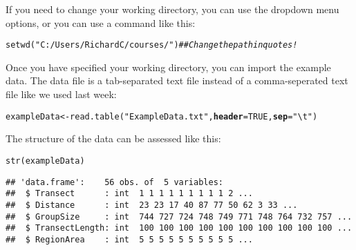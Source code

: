 \documentclass[12pt]{article}\usepackage[]{graphicx}\usepackage[]{color}
\makeatletter
\newcommand{\hlnum}[1]{\textcolor[rgb]{0.69,0.494,0}{#1}}%
\newcommand{\hlstr}[1]{\textcolor[rgb]{0.749,0.012,0.012}{#1}}%
\newcommand{\hlcom}[1]{\textcolor[rgb]{0.514,0.506,0.514}{\textit{#1}}}%
\newcommand{\hlstd}[1]{\textcolor[rgb]{0,0,0}{#1}}%
\newcommand{\hlkwb}[1]{\textcolor[rgb]{0,0.341,0.682}{#1}}%
\newcommand{\hlkwc}[1]{\textcolor[rgb]{0,0,0}{\textbf{#1}}}%
\newcommand{\hlkwd}[1]{\textcolor[rgb]{0.004,0.004,0.506}{#1}}%
\newenvironment{kframe}{%
 \def\at@end@of@kframe{}%
 \ifinner\ifhmode%
  \def\at@end@of@kframe{\end{minipage}}%
  \begin{minipage}{\columnwidth}%
 \fi\fi%
 \def\FrameCommand##1{\hskip\@totalleftmargin \hskip-\fboxsep
 \colorbox{shadecolor}{##1}\hskip-\fboxsep
     \hskip-\linewidth \hskip-\@totalleftmargin \hskip\columnwidth}%
 \MakeFramed {\advance\hsize-\width
   \@totalleftmargin\z@ \linewidth\hsize
   \@setminipage}}%
 {\par\unskip\endMakeFramed%
 \at@end@of@kframe}
\newenvironment{knitrout}{}{} %
\makeatother
\begin{document}
If you need to change your working directory, you can use the dropdown
menu options, or you can use a command like this:

\begin{knitrout}
\color{fgcolor}\begin{kframe}
\begin{alltt}
\hlkwd{setwd}\hlstd{(}\hlstr{"C:/Users/RichardC/courses/"}\hlstd{)} \hlcom{## Change the path in quotes!}
\end{alltt}
\end{kframe}
\end{knitrout}

Once you have specified your working directory, you can import
the example data. The data file is a tab-separated text file
instead of a comma-seperated text file like we used last week:

\begin{knitrout}
\color{fgcolor}\begin{kframe}
\begin{alltt}
\hlstd{exampleData} \hlkwb{<-} \hlkwd{read.table}\hlstd{(}\hlstr{"ExampleData.txt"}\hlstd{,} \hlkwc{header}\hlstd{=}\hlnum{TRUE}\hlstd{,} \hlkwc{sep}\hlstd{=}\hlstr{"\textbackslash{}t"}\hlstd{)}
\end{alltt}
\end{kframe}
\end{knitrout}



The structure of the data can be assessed like this:

\begin{knitrout}
\color{fgcolor}\begin{kframe}
\begin{alltt}
\hlkwd{str}\hlstd{(exampleData)}
\end{alltt}
\begin{verbatim}
## 'data.frame':	56 obs. of  5 variables:
##  $ Transect      : int  1 1 1 1 1 1 1 1 1 2 ...
##  $ Distance      : int  23 23 17 40 87 77 50 62 3 33 ...
##  $ GroupSize     : int  744 727 724 748 749 771 748 764 732 757 ...
##  $ TransectLength: int  100 100 100 100 100 100 100 100 100 100 ...
##  $ RegionArea    : int  5 5 5 5 5 5 5 5 5 5 ...
\end{verbatim}
\end{kframe}
\end{knitrout}
\end{document}
